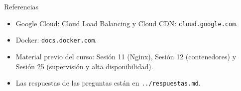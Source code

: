 \documentclass[aspectratio=169,10pt,c]{beamer}
\begin{document}
\begin{frame}{Referencias}
\scriptsize
\begin{itemize}\setlength\itemsep{4pt}
  \item Google Cloud: Cloud Load Balancing y Cloud CDN: \texttt{cloud.google.com}.
  \item Docker: \texttt{docs.docker.com}.
  \item Material previo del curso: Sesión 11 (Nginx), Sesión 12 (contenedores) y Sesión 25 (supervisión y alta disponibilidad).
  \item Las respuestas de las preguntas están en \texttt{../respuestas.md}.
\end{itemize}
\end{frame}
\end{document}
